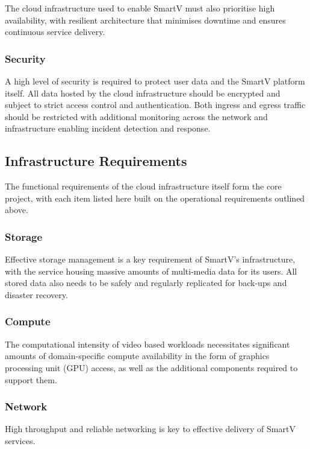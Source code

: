 The cloud infrastructure used to enable SmartV must also prioritise high availability, with resilient architecture that minimises downtime and ensures continuous service delivery. 

\subsubsection*{Security}

A high level of security is required to protect user data and the SmartV platform itself. All data hosted by the cloud infrastructure should be encrypted and subject to strict access control and authentication. Both ingress and egress traffic should be restricted with additional monitoring across the network and infrastructure enabling incident detection and response. 

\subsection{Infrastructure Requirements}

The functional requirements of the cloud infrastructure itself form the core project, with each item listed here built on the operational requirements outlined above.

\subsubsection*{Storage}

Effective storage management is a key requirement of SmartV's infrastructure, with the service housing massive amounts of multi-media data for its users. All stored data also needs to be safely and regularly replicated for back-ups and disaster recovery.


\subsubsection*{Compute}

The computational intensity of video based workloads necessitates significant amounts of domain-specific compute availability in the form of graphics processing unit (GPU) access, as well as the additional components required to support them. 

\subsubsection*{Network}

High throughput and reliable networking is key to effective delivery of SmartV services.

